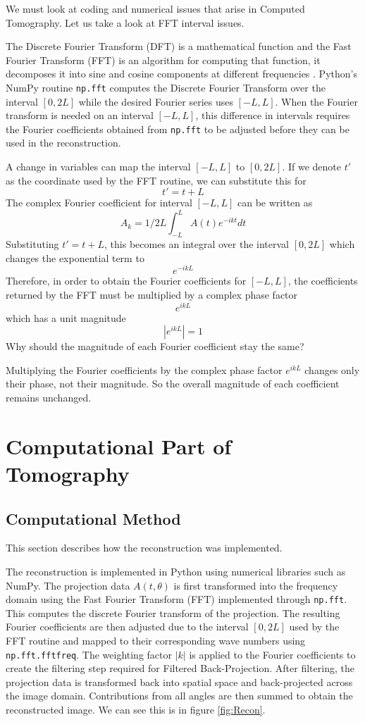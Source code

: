 \documentclass{article}
\begin{document}
We must look at coding and numerical issues that arise in Computed Tomography. Let us take a look at FFT interval issues.

 The Discrete Fourier Transform (DFT) is a mathematical function and the Fast Fourier Transform (FFT) is an algorithm for computing that function, it decomposes it into sine and cosine components at different frequencies \cite{fft2021}. Python's NumPy routine \texttt{np.fft} computes the Discrete Fourier Transform over the interval $[0, 2L]$ while the desired Fourier series uses $[-L, L]$. When the Fourier transform is needed on an interval $[-L, L]$, this difference in intervals requires the Fourier coefficients obtained from \texttt{np.fft} to be adjusted before they can be used in the reconstruction.

 A change in variables can map the interval $[-L, L]$ to $[0,2L]$. If we denote $t'$ as the coordinate used by the FFT routine, we can substitute this for
 \[t' = t + L\]
 The complex Fourier coefficient for interval $[-L, L]$ can be written as 
 \[A_k = 1/2L \int^{L}_{-L} A(t)e^{-ikt}dt\]
Substituting $t'=t+L$, this becomes an integral over the interval $[0, 2L]$ which changes the exponential term to
\[e^{-ikL}\]
Therefore, in order to obtain the Fourier coefficients for $[-L, L]$, the coefficients returned by the FFT must be multiplied by a complex phase factor 
\[e^{ikL}\]
which has a unit magnitude
\[|e^{ikL}| = 1\]
Why should the magnitude of each Fourier coefficient stay the same?

Multiplying the Fourier coefficients by the complex phase factor $e^{ikL}$ changes only their phase, not their magnitude. So the overall magnitude of each coefficient remains unchanged. \cite{fft2021} \cite{fft1997}

\section{Computational Part of Tomography}

\subsection{Computational Method}

This section describes how the reconstruction was implemented. 

The reconstruction is implemented in Python using numerical libraries such as NumPy. The projection data $A(t, \theta)$ is first transformed into the frequency domain using the Fast Fourier Transform (FFT) implemented through \texttt{np.fft}. This computes the discrete Fourier transform of the projection. The resulting Fourier coefficients are then adjusted due to the interval $[0, 2L]$ used by the FFT routine and mapped to their corresponding wave numbers using \texttt{np.fft.fftfreq}. The weighting factor $|k|$ is applied to the Fourier coefficients to create the filtering step required for Filtered Back-Projection. After filtering, the projection data is transformed back into spatial space and back-projected across the image domain. Contributions from all angles are then summed to obtain the reconstructed image. We can see this is in  figure \ref{fig:Recon}.
\end{document}
